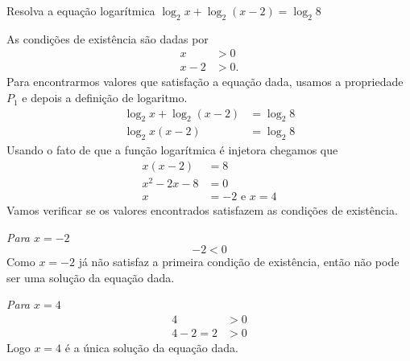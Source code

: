 \begin{example}
  Resolva a equação logarítmica
  \(
    \log_2 x + \log_2(x-2) = \log_2 8
  \)

  \solution
  As condições de existência são dadas por
  \begin{align*}
    x   & > 0 \\
    x-2 & > 0.
  \end{align*}
  Para encontrarmos valores que satisfação a equação dada, usamos a
  propriedade $P_1$ e depois a definição de logaritmo.
  \begin{align*}
    \log_2 x + \log_2(x-2) & = \log_2 8 \\
    \log_2 x (x-2)         & = \log_2 8
  \end{align*}
  Usando o fato de que a função logarítmica é injetora chegamos que
  \begin{align*}
    x(x-2)       & = 8  \\
    x^2 - 2x - 8 & = 0  \\
    x            & = -2 \text{ e } x = 4
  \end{align*}
  Vamos verificar se os valores encontrados satisfazem as condições
  de existência.

  \emph{Para $x=-2$}
  \[
    -2 < 0
  \]
  Como $x=-2$ já não satisfaz a primeira condição de existência,
  então não pode ser uma solução da equação dada.

  \emph{Para $x=4$}
  \begin{align*}
    4       & > 0 \\
    4-2 = 2 & > 0
  \end{align*}
  Logo $x=4$ é a única solução da equação dada.
\end{example}

